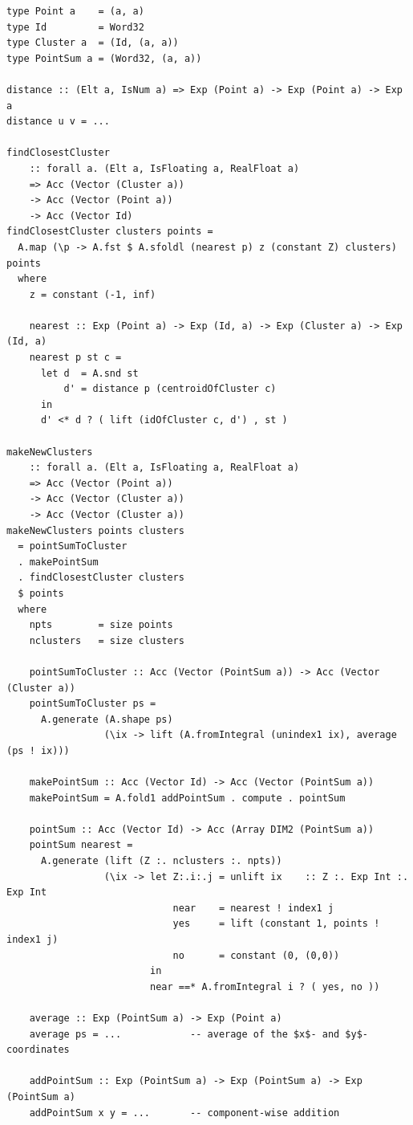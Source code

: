 \begin{lstlisting}[style=haskell_float
    ,label=lst:kmeans
    ,caption={$K$-means clustering for 2D points}]
type Point a    = (a, a)
type Id         = Word32
type Cluster a  = (Id, (a, a))
type PointSum a = (Word32, (a, a))

distance :: (Elt a, IsNum a) => Exp (Point a) -> Exp (Point a) -> Exp a
distance u v = ...

findClosestCluster
    :: forall a. (Elt a, IsFloating a, RealFloat a)
    => Acc (Vector (Cluster a))
    -> Acc (Vector (Point a))
    -> Acc (Vector Id)
findClosestCluster clusters points =
  A.map (\p -> A.fst $ A.sfoldl (nearest p) z (constant Z) clusters) points
  where
    z = constant (-1, inf)

    nearest :: Exp (Point a) -> Exp (Id, a) -> Exp (Cluster a) -> Exp (Id, a)
    nearest p st c =
      let d  = A.snd st
          d' = distance p (centroidOfCluster c)
      in
      d' <* d ? ( lift (idOfCluster c, d') , st )

makeNewClusters
    :: forall a. (Elt a, IsFloating a, RealFloat a)
    => Acc (Vector (Point a))
    -> Acc (Vector (Cluster a))
    -> Acc (Vector (Cluster a))
makeNewClusters points clusters
  = pointSumToCluster
  . makePointSum
  . findClosestCluster clusters
  $ points
  where
    npts        = size points
    nclusters   = size clusters

    pointSumToCluster :: Acc (Vector (PointSum a)) -> Acc (Vector (Cluster a))
    pointSumToCluster ps =
      A.generate (A.shape ps)
                 (\ix -> lift (A.fromIntegral (unindex1 ix), average (ps ! ix)))

    makePointSum :: Acc (Vector Id) -> Acc (Vector (PointSum a))
    makePointSum = A.fold1 addPointSum . compute . pointSum

    pointSum :: Acc (Vector Id) -> Acc (Array DIM2 (PointSum a))
    pointSum nearest =
      A.generate (lift (Z :. nclusters :. npts))
                 (\ix -> let Z:.i:.j = unlift ix    :: Z :. Exp Int :. Exp Int
                             near    = nearest ! index1 j
                             yes     = lift (constant 1, points ! index1 j)
                             no      = constant (0, (0,0))
                         in
                         near ==* A.fromIntegral i ? ( yes, no ))

    average :: Exp (PointSum a) -> Exp (Point a)
    average ps = ...            -- average of the $x$- and $y$-coordinates

    addPointSum :: Exp (PointSum a) -> Exp (PointSum a) -> Exp (PointSum a)
    addPointSum x y = ...       -- component-wise addition
\end{lstlisting}

